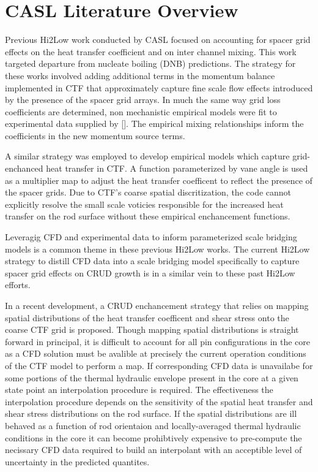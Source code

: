 \section{CASL Literature Overview}

Previous Hi2Low work conducted by CASL focused on accounting for spacer grid effects on the heat transfer coefficient and on inter channel mixing.  This work targeted departure from nucleate boiling (DNB) predictions.  The strategy for these works involved adding additional terms in the momentum balance implemented in CTF that approximately capture fine scale flow effects introduced by the presence of the spacer grid arrays. In much the same way grid loss coefficients are determined, non mechanistic empirical models were fit to experimental data supplied by [].  The empirical mixing relationships inform the coefficients in the new momentum source terms.

A similar strategy was employed to develop empirical models which capture grid-enchanced heat transfer in CTF.  A function parameterized by vane angle is used as a multiplier map to adjust the heat transfer coefficent to reflect the presence of the spacer grids.  Due to CTF's coarse spatial discritization, the code cannot explicitly resolve the small scale voticies responsible for the increased heat transfer on the rod surface without these empirical enchancement functions. 

Leveragig CFD and experimental data to inform parameterized scale bridging models is a common theme in these previous Hi2Low works.  The current Hi2Low strategy to distill CFD data into a scale bridging model specifically to capture spacer grid effects on CRUD growth is in a similar vein to these past Hi2Low efforts.

In a recent development, a CRUD enchancement strategy that relies on mapping spatial distributions of the heat transfer coefficent and shear stress onto the coarse CTF grid is proposed.  Though mapping spatial distributions is straight forward in principal, it is difficult to account for all pin configurations in the core as a CFD solution must be avalible at precisely the current operation conditions of the CTF model to perform a map.  If corresponding CFD data is unavailabe for some portions of the thermal hydraulic envelope present in the core at a given state point an interpolation procedure is required.  The effectiveness the interpolation procedure depends on the sensitivity of the spatial heat transfer and shear stress distributions on the rod surface.  If the spatial distributions are ill behaved as a function of rod orientaion and locally-averaged thermal hydraulic conditions in the core it can become prohibtively expensive to pre-compute the necissary CFD data required to build an interpolant with an acceptible level of uncertainty in the predicted quantites.

